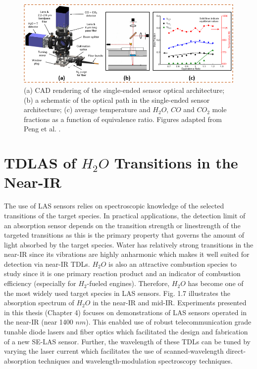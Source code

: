 \begin{figure}[ht]
    \centering
        \includegraphics[width=1\textwidth]{fig/ch1_fig4.png}
        \caption{(a) CAD rendering of the single-ended sensor optical architecture; (b) a schematic of the optical path in the single-ended sensor architecture; (c) average temperature and $H_2O$, $CO$ and $CO_2$ mole fractions as a function of equivalence ratio. Figures adapted from Peng et al. \cite{Peng:16}.}
    \label{fig:ch1_5}
\end{figure}

\section{TDLAS of $H_2O$ Transitions in the Near-IR}
The use of LAS sensors relies on spectroscopic knowledge of the selected transitions of the target species. In practical applications, the detection limit of an absorption sensor depends on the transition strength or linestrength of the targeted transitions as this is the primary property that governs the amount of light absorbed by the target species. Water has relatively strong transitions in the near-IR since its vibrations are highly anharmonic which makes it well suited for detection via near-IR TDLs. $H_2O$ is also an attractive combustion species to study since it is one primary reaction product and an indicator of combustion efficiency (especially for $H_2$-fueled engines). Therefore, $H_2O$ has become one of the most widely used target species in LAS sensors. Fig. 1.7 illustrates the absorption spectrum of $H_2O$ in the near-IR and mid-IR. Experiments presented in this thesis (Chapter 4) focuses on demonstrations of LAS sensors operated in the near-IR (near 1400 $nm$). This enabled use of robust telecommunication grade tunable diode lasers and fiber optics which facilitated the design and fabrication of a new SE-LAS sensor. Further, the wavelength of these TDLs can be tuned by varying the laser current which facilitates the use of scanned-wavelength direct-absorption techniques and wavelength-modulation spectroscopy techniques. 

